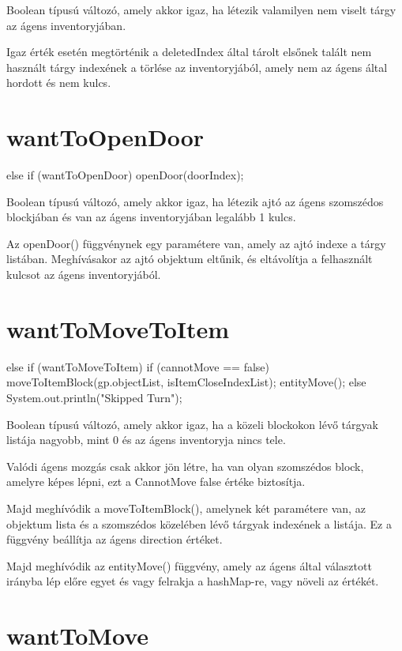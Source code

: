 Boolean típusú változó, amely akkor igaz, ha létezik valamilyen nem viselt tárgy az ágens inventoryjában.

Igaz érték esetén megtörténik a deletedIndex által tárolt elsőnek talált nem használt tárgy indexének a törlése az inventoryjából, 
amely nem az ágens által hordott és nem kulcs.

\section{wantToOpenDoor}
\begin{java}
else if (wantToOpenDoor) {
    openDoor(doorIndex);
}
\end{java}

Boolean típusú változó, amely akkor igaz, ha létezik ajtó az ágens szomszédos blockjában és van az ágens inventoryjában legalább 1 kulcs.

Az openDoor() függvénynek egy paramétere van, amely az ajtó indexe a tárgy listában. Meghívásakor
az ajtó objektum eltűnik, és eltávolítja a felhasznált kulcsot az ágens inventoryjából.

\section{wantToMoveToItem}

\begin{java}
else if (wantToMoveToItem) {
    if (cannotMove == false) {
        moveToItemBlock(gp.objectList,
        isItemCloseIndexList);
        entityMove();
    } else System.out.println("Skipped Turn");
}
\end{java}


Boolean típusú változó, amely akkor igaz, ha a közeli blockokon lévő tárgyak listája nagyobb, mint 0 és az ágens inventoryja nincs tele.

Valódi ágens mozgás csak akkor jön létre, ha van olyan szomszédos block, amelyre képes lépni, ezt a CannotMove false értéke biztosítja.

Majd meghívódik a moveToItemBlock(), amelynek két paramétere van, az objektum lista és a szomszédos közelében lévő tárgyak indexének a listája.
Ez a függvény beállítja az ágens direction értéket.

Majd meghívódik az entityMove() függvény, amely az ágens által választott irányba lép előre egyet és vagy felrakja a hashMap-re, vagy növeli az értékét.

\section{wantToMove}

